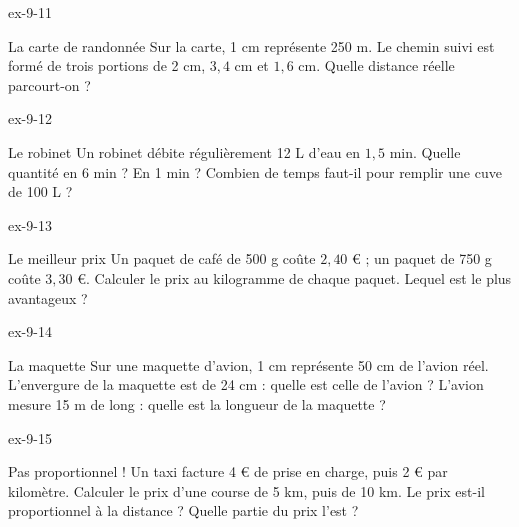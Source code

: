 \begin{blocLivre}{ex-9-11}\begin{exercice}[3]{La carte de randonnée}
Sur la carte, 1 cm représente 250 m. Le chemin suivi est formé de trois portions de 2 cm, $3{,}4$ cm et $1{,}6$ cm. Quelle distance réelle parcourt-on ?
\label{fig-ex-9-11}
\end{exercice}\end{blocLivre}
\begin{blocLivre}{ex-9-12}\begin{exercice}[3]{Le robinet}
Un robinet débite régulièrement 12 L d’eau en $1{,}5$ min. Quelle quantité en 6 min ? En 1 min ? Combien de temps faut-il pour remplir une cuve de 100 L ?
\end{exercice}\end{blocLivre}
\begin{blocLivre}{ex-9-13}\begin{exercice}[3]{Le meilleur prix}
Un paquet de café de 500 g coûte $2{,}40$ € ; un paquet de 750 g coûte $3{,}30$ €. Calculer le prix au kilogramme de chaque paquet. Lequel est le plus avantageux ?
\end{exercice}\end{blocLivre}
\begin{blocLivre}{ex-9-14}\begin{exercice}[3]{La maquette}
Sur une maquette d’avion, 1 cm représente 50 cm de l’avion réel. L’envergure de la maquette est de 24 cm : quelle est celle de l’avion ? L’avion mesure 15 m de long : quelle est la longueur de la maquette ?
\end{exercice}\end{blocLivre}
\begin{blocLivre}{ex-9-15}\begin{exercice}[3]{Pas proportionnel !}
Un taxi facture 4 € de prise en charge, puis 2 € par kilomètre. Calculer le prix d’une course de 5 km, puis de 10 km. Le prix est-il proportionnel à la distance ? Quelle partie du prix l’est ?
\end{exercice}\end{blocLivre}

\clearpage
